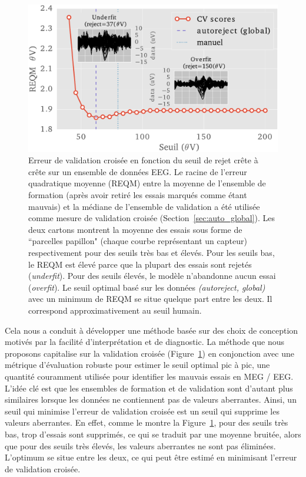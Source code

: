 \begin{figure}[htb]
	\centering
	\includegraphics[width=0.8\linewidth]{figures/figure1_sommaire.pdf}
    \caption[]{Erreur de validation croisée en fonction du seuil de rejet crête à crête sur un ensemble de données EEG. Le racine de l'erreur quadratique moyenne (REQM) entre la moyenne de l'ensemble de formation (après avoir retiré les essais marqués comme étant mauvais) et la médiane de l'ensemble de validation a été utilisée comme mesure de validation croisée (Section~\ref{sec:auto_global}). Les deux cartons montrent la moyenne des essais sous forme de ``parcelles papillon" (chaque courbe représentant un capteur) respectivement pour des seuils très bas et élevés. Pour les seuils bas, le REQM est élevé parce que la plupart des essais sont rejetés (\emph{underfit}). Pour des seuils élevés, le modèle n'abandonne aucun essai (\emph{overfit}). Le seuil optimal basé sur les données \emph{(autoreject, global)} avec un minimum de REQM se situe quelque part entre les deux. Il correspond approximativement au seuil humain.}
    \label{fig:sommaire:cross_val}
\end{figure}

Cela nous a conduit à développer une méthode basée sur des choix de conception motivés par la facilité d’interprétation et de diagnostic. La méthode que nous proposons capitalise sur la validation croisée (Figure~\ref{fig:sommaire:cross_val}) en conjonction avec une métrique d'évaluation robuste pour estimer le seuil optimal pic à pic, une quantité couramment utilisée pour identifier les mauvais essais en MEG / EEG. L'idée clé est que les ensembles de formation et de validation sont d’autant plus similaires lorsque les données ne contiennent pas de valeurs aberrantes. Ainsi, un seuil qui minimise l'erreur de validation croisée est un seuil qui supprime les valeurs aberrantes. En effet, comme le montre la Figure~\ref{fig:sommaire:cross_val}, pour des seuils très bas, trop d'essais sont supprimés, ce qui se traduit par une moyenne bruitée, alors que pour des seuils très élevés, les valeurs aberrantes ne sont pas éliminées. L’optimum se situe entre les deux, ce qui peut être estimé en minimisant l’erreur de validation croisée.


